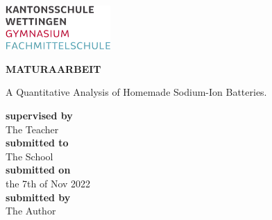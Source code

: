 \begin{titlepage}
\includegraphics[width=0.3\textwidth]{images/kswe_logo.png}
\begin{center}
\vspace{5.5cm}
\Huge
\textbf{MATURAARBEIT}
\vspace{1cm}\\
\begin{LARGE}
A Quantitative Analysis of Homemade Sodium-Ion Batteries.\\
\end{LARGE}
\vspace{3.5cm}
\small
\textbf{supervised by}
\vspace{0.2cm}\\
The Teacher
\vspace{1cm}\\
\textbf{submitted to}
\vspace{0.2cm}\\
The School
\vspace{1cm}\\
\textbf{submitted on}
\vspace{0.2cm}\\
the 7th of Nov 2022
\vspace{1cm}\\
\textbf{submitted by}
\vspace{0.2cm}\\
The Author
\end{center}
\end{titlepage}